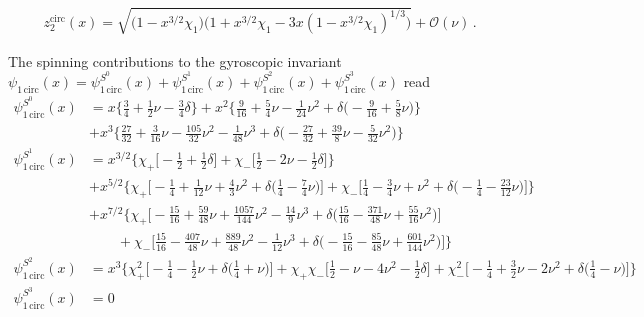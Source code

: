 \documentclass[prd,superscriptaddress,preprintnumbers,tightenlines,nofootinbib, eqsecnum]{revtex4-2}
\newcommand{\nn}{\nonumber}
\begin{document}
\begin{align}
    z_2^\text{circ}(x) = \sqrt{\Big(1-x^{3/2}\chi_1\Big)\Big(1+x^{3/2}\chi_1-3x(1-x^{3/2} \chi_1)^{1/3}\Big)} + \mathcal{O}(\nu)\,.
\end{align}




The spinning contributions to the gyroscopic invariant $\psi_{1\,\text{circ}}(x) = \psi_{1\,\text{circ}}^{S^0}(x) + \psi_{1\,\text{circ}}^{S^1}(x) + \psi_{1\,\text{circ}}^{S^2}(x) + \psi_{1\,\text{circ}}^{S^3}(x)$ read
\begin{subequations}
\begin{align}
\psi_{1\,\text{circ}}^{S^0}(x) &= x\Bigg\{\frac{3}{4} + \frac{1}{2} \nu - \frac{3}{4} \delta\Bigg\}  + x^{2}\Bigg\{\frac{9}{16} + \frac{5}{4} \nu - \frac{1}{24} \nu^{2} + \delta\Bigg(-\frac{9}{16} + \frac{5}{8} \nu\Bigg)\Bigg\} \nn \\
& + x^{3}\Bigg\{\frac{27}{32} + \frac{3}{16} \nu - \frac{105}{32} \nu^{2} - \frac{1}{48} \nu^{3} + \delta\Bigg(-\frac{27}{32} + \frac{39}{8} \nu - \frac{5}{32} \nu^{2}\Bigg)\Bigg\} \\
\psi_{1\,\text{circ}}^{S^1}(x) &= x^{3/2}\Bigg\{\chi_{+}\Bigg[-\frac{1}{2} + \frac{1}{2} \delta\Bigg] + \chi_{-}\Bigg[\frac{1}{2} - 2 \nu - \frac{1}{2} \delta\Bigg]\Bigg\} \nn \\
& + x^{5/2}\Bigg\{\chi_{+}\Bigg[-\frac{1}{4} + \frac{1}{12} \nu + \frac{4}{3} \nu^{2} + \delta\Bigg(\frac{1}{4} - \frac{7}{4} \nu\Bigg)\Bigg] + \chi_{-}\Bigg[\frac{1}{4} - \frac{3}{4} \nu + \nu^{2} + \delta\Bigg(-\frac{1}{4} - \frac{23}{12} \nu\Bigg)\Bigg]\Bigg\} \nn \\
& + x^{7/2}\Bigg\{\chi_{+}\Bigg[-\frac{15}{16} + \frac{59}{48} \nu + \frac{1057}{144} \nu^{2} - \frac{14}{9} \nu^{3} + \delta\Bigg(\frac{15}{16} - \frac{371}{48} \nu + \frac{55}{16} \nu^{2}\Bigg)\Bigg] \nn \\
&\qquad + \chi_{-}\Bigg[\frac{15}{16} - \frac{407}{48} \nu + \frac{889}{48} \nu^{2} - \frac{1}{12} \nu^{3} + \delta\Bigg(-\frac{15}{16} - \frac{85}{48} \nu + \frac{601}{144} \nu^{2}\Bigg)\Bigg]\Bigg\} \\
\psi_{1\,\text{circ}}^{S^2}(x) &= x^{3}\Bigg\{\chi_{+}^2\Bigg[-\frac{1}{4} - \frac{1}{2} \nu + \delta\Bigg(\frac{1}{4} + \nu\Bigg)\Bigg] + \chi_{+}\chi_{-}\Bigg[\frac{1}{2} - \nu - 4 \nu^{2} - \frac{1}{2} \delta\Bigg] + \chi_{-}^2\Bigg[-\frac{1}{4} + \frac{3}{2} \nu - 2 \nu^{2} + \delta\Bigg(\frac{1}{4} - \nu\Bigg)\Bigg]\Bigg\} \\
\psi_{1\,\text{circ}}^{S^3}(x) &= 0
\end{align}
\end{subequations}
\end{document}
